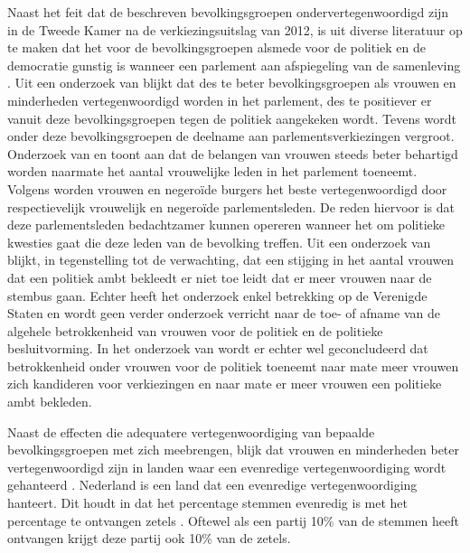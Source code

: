 Naast het feit dat de beschreven bevolkingsgroepen ondervertegenwoordigd zijn in de Tweede Kamer na de verkiezingsuitslag van 2012, is uit diverse literatuur op te maken dat het voor de bevolkingsgroepen alsmede voor de politiek en de democratie gunstig is wanneer een parlement aan afspiegeling van de samenleving  \citep{tremblay1998female,anwar2001participation}. Uit een onderzoek van \cite{banducci2004minority} blijkt dat des te beter bevolkingsgroepen als vrouwen en minderheden vertegenwoordigd worden in het parlement, des te positiever er vanuit deze bevolkingsgroepen tegen de politiek aangekeken wordt. Tevens wordt onder deze bevolkingsgroepen de deelname aan parlementsverkiezingen vergroot. Onderzoek van \cite{wangnerud2009women} en \cite{sainsbury2004women} toont aan dat de belangen van vrouwen steeds beter behartigd worden naarmate het aantal vrouwelijke leden in het parlement toeneemt. Volgens \cite{mansbridge1999should} worden vrouwen en negeroïde burgers het beste vertegenwoordigd door respectievelijk vrouwelijk en negeroïde parlementsleden. De reden hiervoor is dat deze parlementsleden bedachtzamer kunnen opereren wanneer het om politieke kwesties gaat die deze leden van de bevolking treffen. Uit een onderzoek van \cite{broockman2014female} blijkt, in tegenstelling tot de verwachting, dat een stijging in het aantal vrouwen dat een politiek ambt bekleedt er niet toe leidt dat er meer vrouwen naar de stembus gaan. Echter heeft het onderzoek enkel betrekking op de Verenigde Staten en wordt geen verder onderzoek verricht naar de toe- of afname van de algehele betrokkenheid van vrouwen voor de politiek en de politieke besluitvorming. In het onderzoek van \cite{karp2008politics} wordt er echter wel geconcludeerd dat betrokkenheid onder vrouwen voor de politiek toeneemt naar mate meer vrouwen zich kandideren voor verkiezingen en naar mate er meer vrouwen een politieke ambt bekleden. 

Naast de effecten die adequatere vertegenwoordiging van bepaalde bevolkingsgroepen met zich meebrengen, blijk dat vrouwen en minderheden beter vertegenwoordigd zijn in landen waar een evenredige vertegenwoordiging wordt gehanteerd \citep{macivor1999proportional,mcallister2002electoral,studlar1999will,welch1990multi}.  Nederland is een land dat een evenredige vertegenwoordiging hanteert. Dit houdt in dat het percentage stemmen evenredig is met het percentage te ontvangen zetels \citep{Kiess35:online}. Oftewel als een partij 10\% van de stemmen heeft ontvangen krijgt deze partij ook 10\% van de zetels.

